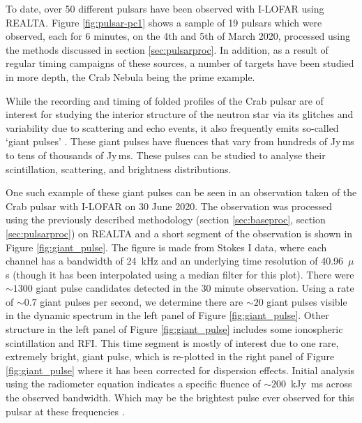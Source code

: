 To date, over 50 different pulsars have been observed with I-LOFAR using REALTA. Figure \ref{fig:pulsar-pc1} shows a sample of 19 pulsars which were observed, each for 6 minutes, on the 4th and 5th of March 2020, processed using the methods discussed in section \ref{sec:pulsarproc}. In addition, as a result of regular timing campaigns of these sources, a number of targets have been studied in more depth, the Crab Nebula being the prime example. 

While the recording and timing of folded profiles of the Crab pulsar are of interest for studying the interior structure of the neutron star via its glitches \citep{Lyne2015} and variability due to scattering and echo events, it also frequently emits so-called `giant pulses' \citep{Meyers2017}. These giant pulses have fluences that vary from hundreds of Jy\,ms to tens of thousands of Jy\,ms. These pulses can be studied to analyse their scintillation, scattering, and brightness distributions.

One such example of these giant pulses can be seen in an observation taken of the Crab pulsar with I-LOFAR on 30 June 2020. The observation was processed using the previously described methodology (section \ref{sec:baseproc}, section \ref{sec:pulsarproc}) on REALTA and a short segment of the observation is shown in Figure \ref{fig:giant_pulse}. The figure is made from Stokes I data, where each channel has a bandwidth of 24~kHz and an underlying time resolution of 40.96~$\mu$s (though it has been interpolated using a median filter for this plot). There were $\sim 1300$ giant pulse candidates detected in the 30 minute observation. Using a rate of $\sim 0.7$ giant pulses per second, we determine there are $\sim 20$ giant pulses visible in the dynamic spectrum in the left panel of Figure \ref{fig:giant_pulse}. Other structure in the left panel of Figure \ref{fig:giant_pulse} includes some ionospheric scintillation and RFI. This time segment is mostly of interest due to one rare, extremely bright, giant pulse, which is re-plotted in the right panel of Figure \ref{fig:giant_pulse} where it has been corrected for dispersion effects. Initial analysis using the radiometer equation indicates a specific fluence of $\sim 200$~kJy~ms across the observed bandwidth. Which may be the brightest pulse ever observed for this pulsar at these frequencies \citep{Karuppusamy2012,Meyers2017,VanLeeuwen2020}.


